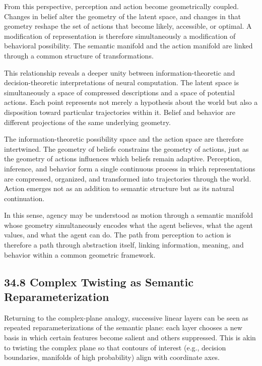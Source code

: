 \documentclass[12pt,letterpaper]{article}
\theoremstyle{remark}
\begin{document}
From this perspective, perception and action become geometrically coupled. Changes in belief alter the geometry of the latent space, and changes in that geometry reshape the set of actions that become likely, accessible, or optimal. A modification of representation is therefore simultaneously a modification of behavioral possibility. The semantic manifold and the action manifold are linked through a common structure of transformations.

This relationship reveals a deeper unity between information-theoretic and decision-theoretic interpretations of neural computation. The latent space is simultaneously a space of compressed descriptions and a space of potential actions. Each point represents not merely a hypothesis about the world but also a disposition toward particular trajectories within it. Belief and behavior are different projections of the same underlying geometry.

The information-theoretic possibility space and the action space are therefore intertwined. The geometry of beliefs constrains the geometry of actions, just as the geometry of actions influences which beliefs remain adaptive. Perception, inference, and behavior form a single continuous process in which representations are compressed, organized, and transformed into trajectories through the world. Action emerges not as an addition to semantic structure but as its natural continuation.

In this sense, agency may be understood as motion through a semantic manifold whose geometry simultaneously encodes what the agent believes, what the agent values, and what the agent can do. The path from perception to action is therefore a path through abstraction itself, linking information, meaning, and behavior within a common geometric framework.

\subsection{34.8 Complex Twisting as Semantic Reparameterization}

Returning to the complex-plane analogy, successive linear layers can be seen as repeated reparameterizations of the semantic plane: each layer chooses a new basis in which certain features become salient and others suppressed. This is akin to twisting the complex plane so that contours of interest (e.g., decision boundaries, manifolds of high probability) align with coordinate axes.
\end{document}
